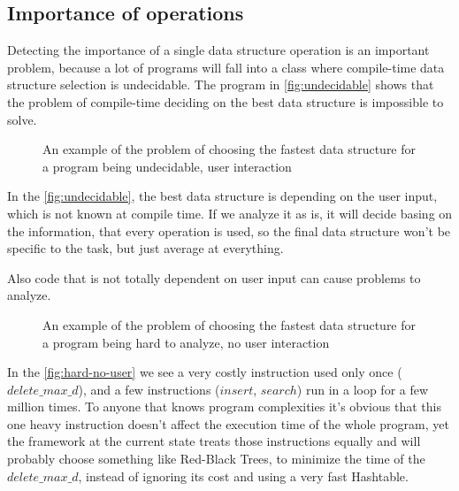 \documentclass[a4paper,11pt]{article}
\begin{document}
	\subsection{Importance of operations} \label{sub:importance}

		Detecting the importance of a single data structure operation is an important problem, because a lot of
		programs will fall into a class where compile-time data structure selection is undecidable. The
        program in \autoref{fig:undecidable} shows that the problem of compile-time deciding on the best data structure
        is impossible to solve.

		\begin{figure}
			

			\caption{An example of the problem of choosing the fastest data structure for a program being
			undecidable, user interaction}

			\label{fig:undecidable}
		\end{figure}

		In the \autoref{fig:undecidable}, the best data structure is depending on the user input, which is not known at
		compile time. If we analyze it as is, it will decide basing on the information, that every operation is
		used, so the final data structure won't be specific to the task, but just average at everything.

		Also code that is not totally dependent on user input can cause problems to analyze.

		\begin{figure}
			

			\caption{An example of the problem of choosing the fastest data structure for a program being hard to
            analyze, no user interaction}

			\label{fig:hard-no-user}
		\end{figure}

		In the \autoref{fig:hard-no-user} we see a very costly instruction used only once
		($delete\_max\_d$), and a few instructions ($insert$, $search$) run in a loop for a few million times.
		To anyone that knows program complexities it's obvious that this one heavy instruction doesn't affect
		the execution time of the whole program, yet the framework at the current state treats those
		instructions equally and will probably choose something like Red-Black Trees, to minimize the time of
		the $delete\_max\_d$, instead of ignoring its cost and using a very fast Hashtable.
\end{document}
